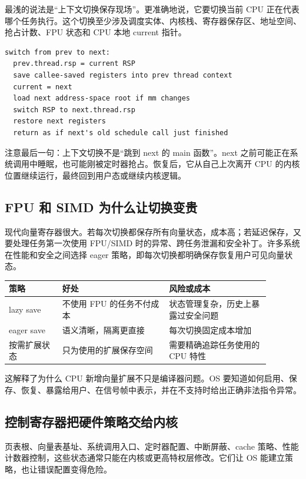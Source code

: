 最浅的说法是“上下文切换保存现场”。更准确地说，它要切换当前 CPU 正在代表哪个任务执行。这个切换至少涉及调度实体、内核栈、寄存器保存区、地址空间、抢占计数、FPU 状态和 CPU 本地 current 指针。

\begin{lstlisting}
switch from prev to next:
  prev.thread.rsp = current RSP
  save callee-saved registers into prev thread context
  current = next
  load next address-space root if mm changes
  switch RSP to next.thread.rsp
  restore next registers
  return as if next's old schedule call just finished
\end{lstlisting}

注意最后一句：上下文切换不是“跳到 next 的 main 函数”。next 之前可能正在系统调用中睡眠，也可能刚被定时器抢占。恢复后，它从自己上次离开 CPU 的内核位置继续运行，最终回到用户态或继续内核逻辑。

\subsection{FPU 和 SIMD 为什么让切换变贵}

现代向量寄存器很大。若每次切换都保存所有向量状态，成本高；若延迟保存，又要处理任务第一次使用 FPU/SIMD 时的异常、跨任务泄漏和安全补丁。许多系统在性能和安全之间选择 eager 策略，即每次切换都明确保存恢复用户可见向量状态。

\begin{longtable}{p{0.18\linewidth}p{0.36\linewidth}p{0.34\linewidth}}
\toprule
策略 & 好处 & 风险或成本 \\
\midrule
lazy save & 不使用 FPU 的任务不付成本 & 状态管理复杂，历史上暴露过安全问题 \\
eager save & 语义清晰，隔离更直接 & 每次切换固定成本增加 \\
按需扩展状态 & 只为使用的扩展保存空间 & 需要精确追踪任务使用的 CPU 特性 \\
\bottomrule
\end{longtable}

这解释了为什么 CPU 新增向量扩展不只是编译器问题。OS 要知道如何启用、保存、恢复、暴露给用户、在信号帧中表示，并在不支持时给出正确非法指令异常。

\subsection{控制寄存器把硬件策略交给内核}

页表根、向量表基址、系统调用入口、定时器配置、中断屏蔽、cache 策略、性能计数器控制，这些状态通常只能在内核或更高特权层修改。它们让 OS 能建立策略，也让错误配置变得危险。

